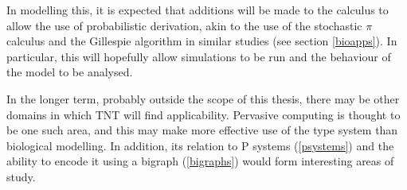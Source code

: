 In modelling this, it is expected that additions will be made to the
calculus to allow the use of probabilistic derivation, akin to the use
of the stochastic $\pi$ calculus and the Gillespie algorithm in similar
studies (see section \ref{bioapps}).  In particular, this will hopefully
allow simulations to be run and the behaviour of the model to be
analysed.

In the longer term, probably outside the scope of this thesis, there may
be other domains in which TNT will find applicability.  Pervasive
computing is thought to be one such area, and this may make more
effective use of the type system than biological modelling.  In
addition, its relation to P systems (\ref{psystems}) and the ability to
encode it using a bigraph (\ref{bigraphs}) would form interesting areas
of study.